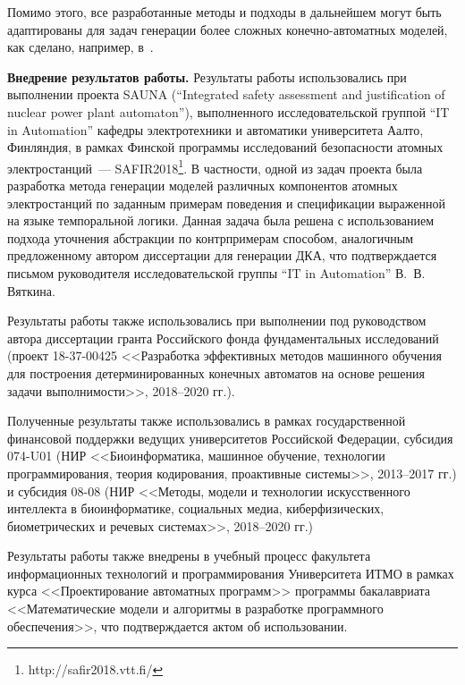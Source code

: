 Помимо этого, все разработанные методы и подходы в дальнейшем могут быть адаптированы для задач генерации более сложных конечно-автоматных моделей, как сделано, например, в~\cite{ulyantsev-phd-13}.

\textbf{Внедрение результатов работы.}
Результаты работы использовались при выполнении проекта SAUNA (``Integrated safety assessment and justification of nuclear power plant automaton''), выполненного исследовательской группой ``IT in Automation'' кафедры электротехники и автоматики университета Аалто, Финляндия, в рамках Финской программы исследований безопасности атомных электростанций~--- SAFIR2018\footnote{http://safir2018.vtt.fi/}.
В частности, одной из задач проекта была разработка метода генерации моделей различных компонентов атомных электростанций по заданным примерам поведения и спецификации выраженной на языке темпоральной логики.
Данная задача была решена с использованием подхода уточнения абстракции по контрпримерам способом, аналогичным предложенному автором диссертации для генерации ДКА, что подтверждается письмом руководителя исследовательской группы ``IT in Automation'' В.~В. Вяткина.

Результаты работы также использовались при выполнении под руководством автора диссертации гранта Российского фонда фундаментальных исследований (проект 18-37-00425 <<Разработка эффективных методов машинного обучения для построения детерминированных конечных автоматов на основе решения задачи выполнимости>>, 2018--2020 гг.).

Полученные результаты также использовались в рамках государственной финансовой поддержки ведущих университетов Российской Федерации, субсидия 074-U01 (НИР <<Биоинформатика, машинное обучение, технологии программирования, теория кодирования, проактивные системы>>, 2013--2017 гг.) и субсидия 08-08 (НИР <<Методы, модели и технологии искусственного интеллекта в биоинформатике, социальных медиа, киберфизических, биометрических и речевых системах>>, 2018--2020 гг.)

Результаты работы также внедрены в учебный процесс факультета информационных технологий и программирования Университета ИТМО в рамках курса <<Проектирование автоматных программ>> программы бакалавриата <<Математические модели и алгоритмы в разработке программного обеспечения>>, что подтверждается актом об использовании.

